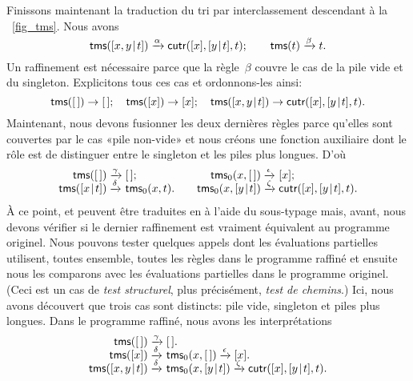 Finissons maintenant la traduction du tri par interclassement
descendant à la \fig~\vref{fig_tms}. Nous avons
\begin{equation*}
\textsf{tms}([{x,y}\!\mid\!{t}]) \xrightarrow{\smash{\alpha}}
 \textsf{cutr}([x],[{y}\!\mid\!{t}],t);\qquad
\textsf{tms}(t) \xrightarrow{\smash{\beta}} t.
\end{equation*}
Un raffinement est nécessaire parce que la règle~\(\beta\) couvre le
cas de la pile vide et du singleton. Explicitons tous ces cas et
ordonnons-les ainsi:
\begin{equation*}
\textsf{tms}([\,])            \rightarrow  [\,];\quad
\textsf{tms}([x])            \rightarrow  [x];\quad
\textsf{tms}([{x,y}\!\mid\!{t}])  \rightarrow
                          \textsf{cutr}([x],[{y}\!\mid\!{t}],t).
\end{equation*}
Maintenant, nous devons fusionner les deux dernières règles parce
qu'elles sont couvertes par le cas «pile non-vide» et nous créons une
fonction auxiliaire  dont le rôle est de distinguer
entre le singleton et les piles plus longues. D'où
\begin{equation*}
\begin{array}{@{}r@{\;}l@{\;}l@{\qquad}r@{\;}l@{\;}l@{}}
  \fun{tms}(\el)             & \xrightarrow{\smash{\gamma}} & \el;
& \fun{tms}_0(x,\el)         & \xrightarrow{\smash{\epsilon}} & [x];\\
\fun{tms}(\cons{x}{t})       & \xrightarrow{\smash{\delta}}
                             & \fun{tms}_0(x,t).
& \fun{tms}_0(x,\cons{y}{t}) & \xrightarrow{\smash{\zeta}}
                             & \fun{cutr}([x],\cons{y}{t},t).
\end{array}
\end{equation*}
À ce point,  et  peuvent être traduites en
\Java à l'aide du sous-typage mais, avant, nous devons vérifier si le
dernier raffinement est vraiment équivalent au programme
originel. Nous pouvons tester quelques appels dont les évaluations
partielles
utilisent, toutes ensemble, toutes les règles dans le programme
raffiné et ensuite nous les comparons avec les évaluations partielles
dans le programme originel. (Ceci est un cas de \emph{test
  structurel}, plus précisément,
\emph{test de chemins}.) Ici, nous avons
découvert que trois cas sont distincts: pile vide, singleton et piles
plus longues. Dans le programme raffiné, nous avons les
interprétations
\begin{equation*}
\begin{array}{@{}r@{\;}l@{\;}l@{}}
\fun{tms}(\el) & \xrightarrow{\smash{\gamma}} & \el.\\
\fun{tms}([x]) & \xrightarrow{\smash{\delta}} & \fun{tms}_0(x,\el)
                 \xrightarrow{\smash{\epsilon}} [x].\\
\fun{tms}(\cons{x,y}{t})
  & \xrightarrow{\smash{\delta}} & \fun{tms}_0(x,\cons{y}{t})
    \xrightarrow{\smash{\zeta}} \fun{cutr}([x],\cons{y}{t},t).
\end{array}
\end{equation*}
